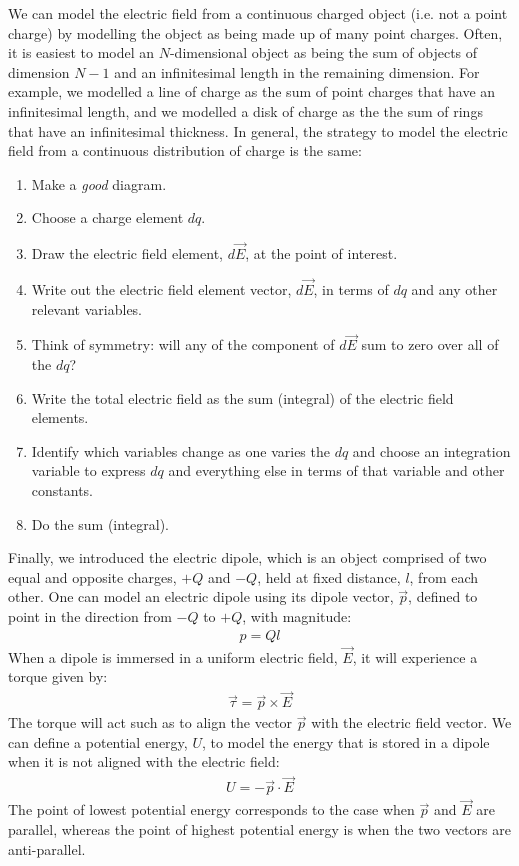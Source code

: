 \begin{chapterSummary}
We can model the electric field from a continuous charged object (i.e. not a point charge) by modelling the object as being made up of many point charges. Often, it is easiest to model an $N$-dimensional object as being the sum of objects of dimension $N-1$ and an infinitesimal length in the remaining dimension. For example, we modelled a line of charge as the sum of point charges that have an infinitesimal length, and we modelled a disk of charge as the the sum of rings that have an infinitesimal thickness. In general, the strategy to model the electric field from a continuous distribution of charge is the same:

\begin{enumerate}
\item Make a \textit{good} diagram.
\item Choose a charge element $dq$.
\item Draw the electric field element, $d\vec E$, at the point of interest.
\item Write out the electric field element vector, $d\vec E$, in terms of $dq$ and any other relevant variables.
\item Think of symmetry: will any of the component of $d\vec E$ sum to zero over all of the $dq$?
\item Write the total electric field as the sum (integral) of the electric field elements.
\item Identify which variables change as one varies the $dq$ and choose an integration variable to express $dq$ and everything else in terms of that variable and other constants.
\item Do the sum (integral).
\end{enumerate}



Finally, we introduced the electric dipole, which is an object comprised of two equal and opposite charges, $+Q$ and $-Q$, held at fixed distance, $l$, from each other. One can model an electric dipole using its dipole vector, $\vec p$, defined to point in the direction from $-Q$ to $+Q$, with magnitude:
\begin{align*}
p=Ql
\end{align*} 
When a dipole is immersed in a uniform electric field, $\vec E$, it will experience a torque given by:
\begin{align*}
\vec\tau=\vec p\times \vec E
\end{align*}
The torque will act such as to align the vector $\vec p$ with the electric field vector. We can define a potential energy, $U$, to model the energy that is stored in a dipole when it is not aligned with the electric field:
\begin{align*}
U=-\vec p \cdot \vec E
\end{align*}
The point of lowest potential energy corresponds to the case when $\vec p$ and $\vec E$ are parallel, whereas the point of highest potential energy is when the two vectors are anti-parallel.
\end{chapterSummary}

